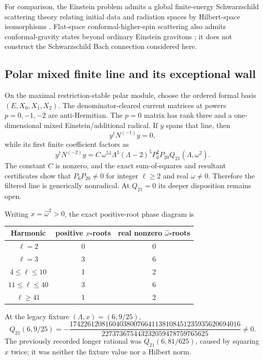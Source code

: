 \documentclass[11pt]{article}
\theoremstyle{definition}
\theoremstyle{remark}
\begin{document}
For comparison, the Einstein problem admits a global finite-energy
Schwarzschild scattering theory relating initial data and radiation spaces
by Hilbert-space isomorphisms \cite{MasaoodScattering}.  Flat-space
conformal-higher-spin scattering also admits conformal-gravity states beyond
ordinary Einstein gravitons \cite{AdamoNakachTseytlin}; it does not construct
the Schwarzschild Bach connection considered here.

\subsection{Polar mixed finite line and its exceptional wall}

On the maximal restriction-stable polar module, choose the ordered formal
basis \((E,X_0,X_1,X_2)\).  The denominator-cleared current matrices at
powers \(p=0,-1,-2\) are anti-Hermitian.  The \(p=0\) matrix has rank three
and a one-dimensional mixed Einstein/additional radical.  If \(y\) spans
that line, then
\begin{equation}
 y^\dagger N^{(-1)}y=0,
\end{equation}
while its first finite coefficient factors as
\begin{equation}\label{eq:polar-q21-wall}
 y^\dagger N^{(-2)}y=
 C\,\omega^{51}\Lambda^3(\Lambda-2)^5P_6^2P_{20}
 Q_{21}(\Lambda,\omega^2).
\end{equation}
The constant \(C\) is nonzero, and the exact sum-of-squares and resultant
certificates show that \(P_6P_{20}\ne0\) for integer \(\ell\ge2\) and real
\(\omega\ne0\).  Therefore the filtered line is generically nonradical.  At
\(Q_{21}=0\) its deeper disposition remains open.

Writing \(x=\widehat\omega^2>0\), the exact positive-root phase diagram is
\begin{center}
\begin{tabular}{@{}c c c@{}}
\toprule
Harmonic & positive \(x\)-roots & real nonzero \(\widehat\omega\)-roots\\
\midrule
\(\ell=2\) & 0 & 0\\
\(\ell=3\) & 3 & 6\\
\(4\le\ell\le10\) & 1 & 2\\
\(11\le\ell\le40\) & 3 & 6\\
\(\ell\ge41\) & 1 & 2\\
\bottomrule
\end{tabular}
\end{center}
At the legacy fixture \((\Lambda,x)=(6,9/25)\),
\begin{equation}
 Q_{21}(6,9/25)=
 -\frac{174226120816040380076641138108451235935620694016}
 {227373675443232059478759765625}\ne0.
\end{equation}
The previously recorded longer rational was \(Q_{21}(6,81/625)\), caused by
squaring \(x\) twice; it was neither the fixture value nor a Hilbert norm.
\end{document}
